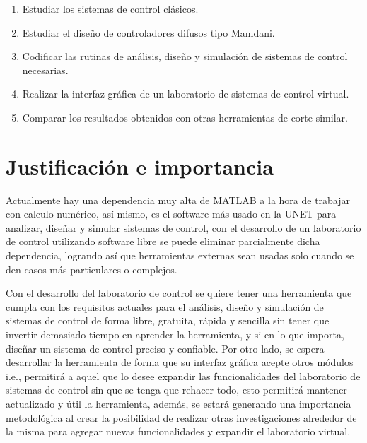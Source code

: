		\begin{enumerate}[leftmargin=\parindent]
			
			\item Estudiar los sistemas de control clásicos.
			
			\item Estudiar el diseño de controladores difusos tipo Mamdani.
			
			\item Codificar las rutinas de análisis, diseño y simulación de sistemas de control necesarias.
			
			\item Realizar la interfaz gráfica de un laboratorio de sistemas de control virtual.
			
			\item Comparar los resultados obtenidos con otras herramientas de corte similar.
		
	\end{enumerate}

\section{Justificación e importancia}
	
	Actualmente hay una dependencia muy alta de MATLAB a la hora de trabajar con calculo numérico, así mismo, es el software más usado en la UNET para analizar, diseñar y simular sistemas de control, con el desarrollo de un laboratorio de control utilizando software libre se puede eliminar parcialmente dicha dependencia, logrando así que herramientas externas sean usadas solo cuando se den casos más particulares o complejos.
	
	Con el desarrollo del laboratorio de control se quiere tener una herramienta que cumpla con los requisitos actuales para el análisis, diseño y simulación de sistemas de control de forma libre, gratuita, rápida y sencilla sin tener que invertir demasiado tiempo en aprender la herramienta, y si en lo que importa, diseñar un sistema de control preciso y confiable.
	Por otro lado, se espera desarrollar la herramienta de forma que su interfaz gráfica acepte otros módulos i.e., permitirá a aquel que lo desee expandir las funcionalidades del laboratorio de sistemas de control sin que se tenga que rehacer todo, esto permitirá mantener actualizado y útil la herramienta, además, se estará generando una importancia metodológica al crear la posibilidad de realizar otras investigaciones alrededor de la misma para agregar nuevas funcionalidades y expandir el laboratorio virtual.
	
